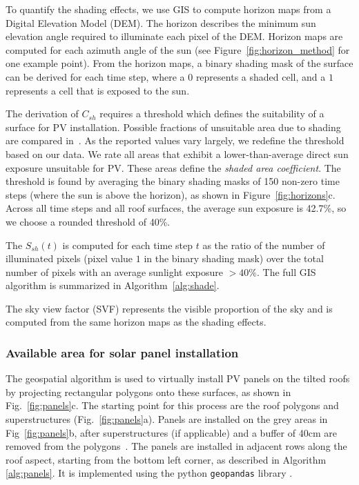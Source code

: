 To quantify the shading effects, we use GIS to compute horizon maps from a Digital Elevation Model (DEM). 
The horizon describes the minimum sun elevation angle required to illuminate each pixel of the DEM. 
Horizon maps are computed for each azimuth angle of the sun (see Figure~\ref{fig:horizon_method} for one example point). From the horizon maps, a binary shading mask of the surface can be derived for each time step, where a $0$ represents a shaded cell, and a $1$ represents a cell that is exposed to the sun.

The derivation of $C_{sh}$ requires a threshold which defines the suitability of a surface for PV installation. Possible fractions of unsuitable area due to shading are compared in~\cite{wiginton_quantifying_2010}. As the reported values vary largely, we redefine the threshold based on our data. We rate all areas that exhibit a lower-than-average direct sun exposure unsuitable for PV. These areas define the \textit{shaded area coefficient}. The threshold is found by averaging the binary shading masks of 150 non-zero time steps (where the sun is above the horizon), as shown in Figure~\ref{fig:horizons}c. Across all time steps and all roof surfaces, the average sun exposure is 42.7\%, so we choose a rounded threshold of 40\%.

The $S_{sh}(t)$ is computed for each time step $t$ as the ratio of the number of illuminated pixels (pixel value $1$ in the binary shading mask) over the total number of pixels with an average sunlight exposure $> 40\%$. The full GIS algorithm is summarized in Algorithm~\ref{alg:shade}. 

The sky view factor (SVF) represents the visible proportion of the sky and is computed from the same horizon maps as the shading effects.

\subsubsection{Available area for solar panel installation}

The geospatial algorithm is used to virtually install PV panels on the tilted roofs by projecting rectangular polygons onto these surfaces, as shown in Fig.~\ref{fig:panels}c. 
The starting point for this process are the roof polygons and superstructures (Fig.~\ref{fig:panels}a). Panels are installed on the grey areas in Fig~\ref{fig:panels}b, after superstructures (if applicable) and a buffer of 40cm are removed from the polygons~\cite{assouline_large-scale_2018}. The panels are installed in adjacent rows along the roof aspect, starting from the bottom left corner, as described in Algorithm \ref{alg:panels}. It is implemented using the python \texttt{geopandas} library \cite{kelsey_jordahl_geopandas/geopandas:_2019}.

